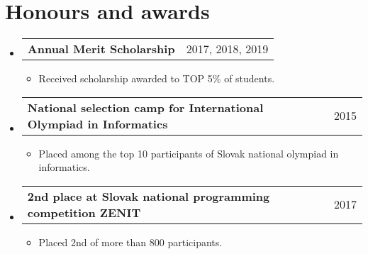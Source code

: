 \documentclass[letterpaper,11pt]{article}
\makeatletter
\newcommand{\resumeItem}[2]{
  \item\small{
    \textbf{#1}{#2 \vspace{-2pt}}
  }
}
\newcommand{\resumeSubheadingMY}[4]{
  \vspace{-1pt}\item
    \begin{tabular*}{0.97\textwidth}{l@{\extracolsep{\fill}}r}
      \textbf{#1} & #2 \\
    \end{tabular*}\vspace{-5pt}
}
\newcommand{\resumeSubHeadingListStart}{\begin{itemize}[leftmargin=*]}
\newcommand{\resumeSubHeadingListEnd}{\end{itemize}}
\newcommand{\resumeItemListStart}{\begin{itemize}}
\newcommand{\resumeItemListEnd}{\end{itemize}\vspace{-5pt}}
\makeatother
\begin{document}
 \section{Honours and awards}
  \resumeSubHeadingListStart
    \resumeSubheadingMY
      {Annual Merit Scholarship}{2017, 2018, 2019}
      {}{}
      \resumeItemListStart
        \resumeItem{}
          {Received scholarship awarded to TOP 5\% of students.}
      \resumeItemListEnd
    \resumeSubheadingMY
      {National selection camp for International Olympiad in Informatics}{2015}
      {}{}
      \resumeItemListStart
        \resumeItem{}
          {Placed among the top 10 participants of Slovak national olympiad in informatics.}
      \resumeItemListEnd
     \resumeSubheadingMY
      {2nd place at Slovak national programming competition ZENIT}{2017}
      {}{}
      \resumeItemListStart
        \resumeItem{}
          {Placed 2nd of more than 800 participants.}
      \resumeItemListEnd
      
  \resumeSubHeadingListEnd

\end{document}
